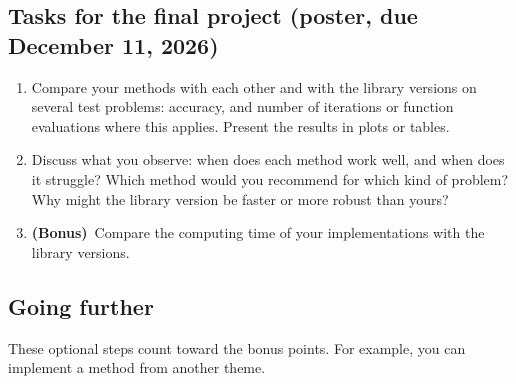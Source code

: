 \documentclass[11pt,a4paper]{article}
\newcommand{\bonus}{\textbf{(Bonus)}}
\begin{document}
\subsection*{Tasks for the final project (poster, due December 11, 2026)}
\begin{enumerate}
  \item Compare your methods with each other and with the library versions
        on several test problems: accuracy, and number of iterations or
        function evaluations where this applies. Present the results in
        plots or tables.
  \item Discuss what you observe: when does each method work well, and when
        does it struggle? Which method would you recommend for which kind of
        problem? Why might the library version be faster or more robust than
        yours?
  \item \bonus\ Compare the computing time of your implementations with the
        library versions.
\end{enumerate}

\subsection*{Going further}
These optional steps count toward the bonus points. For example, you can
implement a method from another theme.
\end{document}
